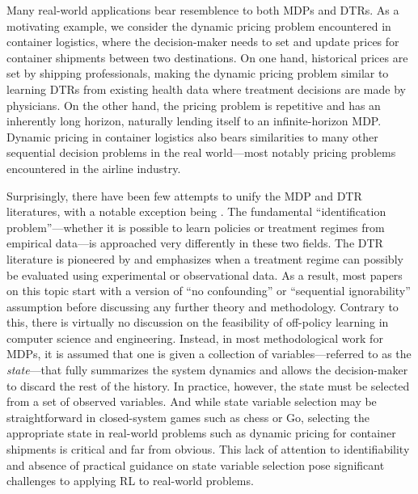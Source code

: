 \documentclass[12pt,a4paper]{article}
\theoremstyle{definition}
\begin{document}
Many real-world applications bear resemblence to both MDPs and
DTRs. As a motivating example, we consider the dynamic pricing problem
encountered in container logistics, where the decision-maker needs to
set and update prices for container shipments between two
destinations. On one hand, historical prices are set by shipping
professionals, making the dynamic pricing problem similar to learning
DTRs from existing health data where treatment decisions are made by
physicians. On the other hand, the pricing problem is repetitive and
has an inherently long horizon, naturally lending itself to an
infinite-horizon MDP. Dynamic pricing in container logistics also
bears similarities to many other sequential decision problems in the
real world---most notably pricing problems encountered in the airline
industry.


Surprisingly, there have been few attempts to unify the MDP and DTR literatures,
with a notable exception being
\textcite{ertefaie_constructing_2018}. The fundamental
``identification problem''---whether it is possible to
learn policies or treatment regimes from empirical data---is approached
very differently in these two fields. The DTR literature is pioneered by
\textcite{robins_new_1986} and emphasizes when a treatment regime can
possibly be evaluated using experimental or observational data. As a
result, most papers on this topic start with a version of ``no
confounding'' or ``sequential
ignorability'' assumption before discussing any further theory and
methodology. Contrary to this, there is virtually no discussion on the
feasibility of off-policy learning in computer science and
engineering. Instead, in most methodological work for MDPs, it is
assumed that one is given a collection of variables---referred to
as the \emph{state}---that fully summarizes the system dynamics
and allows the decision-maker to discard the rest of the history.
In practice, however, the state must be selected from
a set of observed variables. And while
state variable selection may be straightforward in closed-system games
such as chess or Go, selecting the appropriate state in real-world
problems such as dynamic pricing for container shipments is critical
and far from obvious. %
This lack of attention to identifiability and absence of practical
guidance on state variable selection pose significant challenges to applying
RL to real-world problems.
\end{document}
